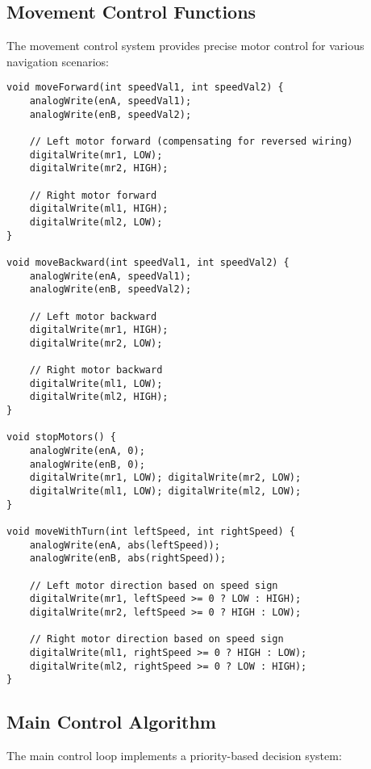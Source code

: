 \documentclass[12pt,a4paper]{article}
\begin{document}
\subsection{Movement Control Functions}

The movement control system provides precise motor control for various navigation scenarios:

\begin{lstlisting}[caption={Basic Movement Functions}, label={lst:movement}]
void moveForward(int speedVal1, int speedVal2) {
    analogWrite(enA, speedVal1);
    analogWrite(enB, speedVal2);
    
    // Left motor forward (compensating for reversed wiring)
    digitalWrite(mr1, LOW);
    digitalWrite(mr2, HIGH);
    
    // Right motor forward
    digitalWrite(ml1, HIGH);
    digitalWrite(ml2, LOW);
}

void moveBackward(int speedVal1, int speedVal2) {
    analogWrite(enA, speedVal1);
    analogWrite(enB, speedVal2);
    
    // Left motor backward
    digitalWrite(mr1, HIGH);
    digitalWrite(mr2, LOW);
    
    // Right motor backward
    digitalWrite(ml1, LOW);
    digitalWrite(ml2, HIGH);
}

void stopMotors() {
    analogWrite(enA, 0);
    analogWrite(enB, 0);
    digitalWrite(mr1, LOW); digitalWrite(mr2, LOW);
    digitalWrite(ml1, LOW); digitalWrite(ml2, LOW);
}

void moveWithTurn(int leftSpeed, int rightSpeed) {
    analogWrite(enA, abs(leftSpeed));
    analogWrite(enB, abs(rightSpeed));
    
    // Left motor direction based on speed sign
    digitalWrite(mr1, leftSpeed >= 0 ? LOW : HIGH);
    digitalWrite(mr2, leftSpeed >= 0 ? HIGH : LOW);
    
    // Right motor direction based on speed sign
    digitalWrite(ml1, rightSpeed >= 0 ? HIGH : LOW);
    digitalWrite(ml2, rightSpeed >= 0 ? LOW : HIGH);
}
\end{lstlisting}

\subsection{Main Control Algorithm}

The main control loop implements a priority-based decision system:
\end{document}
